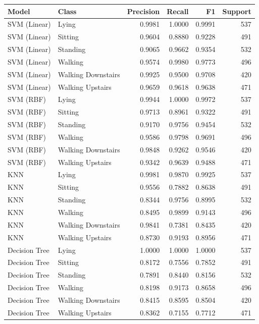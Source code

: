 \begin{tabular}{llrrrr}
\toprule
Model & Class & Precision & Recall & F1 & Support \\
\midrule
SVM (Linear) & Lying & 0.9981 & 1.0000 & 0.9991 & 537 \\
SVM (Linear) & Sitting & 0.9604 & 0.8880 & 0.9228 & 491 \\
SVM (Linear) & Standing & 0.9065 & 0.9662 & 0.9354 & 532 \\
SVM (Linear) & Walking & 0.9574 & 0.9980 & 0.9773 & 496 \\
SVM (Linear) & Walking Downstairs & 0.9925 & 0.9500 & 0.9708 & 420 \\
SVM (Linear) & Walking Upstairs & 0.9659 & 0.9618 & 0.9638 & 471 \\
SVM (RBF) & Lying & 0.9944 & 1.0000 & 0.9972 & 537 \\
SVM (RBF) & Sitting & 0.9713 & 0.8961 & 0.9322 & 491 \\
SVM (RBF) & Standing & 0.9170 & 0.9756 & 0.9454 & 532 \\
SVM (RBF) & Walking & 0.9586 & 0.9798 & 0.9691 & 496 \\
SVM (RBF) & Walking Downstairs & 0.9848 & 0.9262 & 0.9546 & 420 \\
SVM (RBF) & Walking Upstairs & 0.9342 & 0.9639 & 0.9488 & 471 \\
KNN & Lying & 0.9981 & 0.9870 & 0.9925 & 537 \\
KNN & Sitting & 0.9556 & 0.7882 & 0.8638 & 491 \\
KNN & Standing & 0.8344 & 0.9756 & 0.8995 & 532 \\
KNN & Walking & 0.8495 & 0.9899 & 0.9143 & 496 \\
KNN & Walking Downstairs & 0.9841 & 0.7381 & 0.8435 & 420 \\
KNN & Walking Upstairs & 0.8730 & 0.9193 & 0.8956 & 471 \\
Decision Tree & Lying & 1.0000 & 1.0000 & 1.0000 & 537 \\
Decision Tree & Sitting & 0.8172 & 0.7556 & 0.7852 & 491 \\
Decision Tree & Standing & 0.7891 & 0.8440 & 0.8156 & 532 \\
Decision Tree & Walking & 0.8198 & 0.9173 & 0.8658 & 496 \\
Decision Tree & Walking Downstairs & 0.8415 & 0.8595 & 0.8504 & 420 \\
Decision Tree & Walking Upstairs & 0.8362 & 0.7155 & 0.7712 & 471 \\
\bottomrule
\end{tabular}
